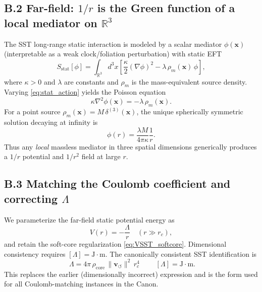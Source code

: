 \documentclass[10pt,reprint,aps,onecolumn,nofootinbib]{revtex4-2}
\begin{document}
    \subsection*{B.2 Far-field: $1/r$ is the Green function of a local mediator on $\mathbb{R}^3$}
    The SST long-range static interaction is modeled by a scalar mediator $\phi(\mathbf{x})$
    (interpretable as a weak clock/foliation perturbation) with static EFT
    \begin{equation}
    S_{\mathrm{stat}}[\phi]=\int_{\mathbb{R}^3} d^3x\left[\frac{\kappa}{2}(\nabla\phi)^2-\lambda\,\rho_m(\mathbf{x})\,\phi\right],
    \label{eq:stat_action}
    \end{equation}
    where $\kappa>0$ and $\lambda$ are constants and $\rho_m$ is the mass-equivalent source density.
    Varying \eqref{eq:stat_action} yields the Poisson equation
    \begin{equation}
    \kappa \nabla^2\phi(\mathbf{x})=-\lambda\,\rho_m(\mathbf{x}).
    \label{eq:poisson_phi}
    \end{equation}
    For a point source $\rho_m(\mathbf{x})=M\,\delta^{(3)}(\mathbf{x})$, the unique spherically symmetric solution decaying at infinity is
    \begin{equation}
    \phi(r)=\frac{\lambda M}{4\pi\kappa}\frac{1}{r}.
    \end{equation}
    Thus any \emph{local} massless mediator in three spatial dimensions generically produces a $1/r$ potential and $1/r^2$ field at large $r$.

    \subsection*{B.3 Matching the Coulomb coefficient and correcting $\Lambda$}
    We parameterize the far-field static potential energy as
    \begin{equation}
    V(r)=-\frac{\Lambda}{r}\quad (r\gg r_c),
    \end{equation}
    and retain the soft-core regularization \eqref{eq:VSST_softcore}. Dimensional consistency requires
    $[\Lambda]=\mathrm{J\cdot m}$.
    The canonically consistent SST identification is
    \begin{equation}
    \boxed{\;\Lambda = 4\pi\,\rho_{\text{core}}\,\lVert \mathbf{v}_{\!\boldsymbol{\circlearrowleft}}\rVert^{2}\,r_c^{4}\;}
    \qquad [\Lambda]=\mathrm{J\cdot m}.
    \label{eq:Lambda_correct}
    \end{equation}
    This replaces the earlier (dimensionally incorrect) expression and is the form used for all Coulomb-matching instances in the Canon.
\end{document}
